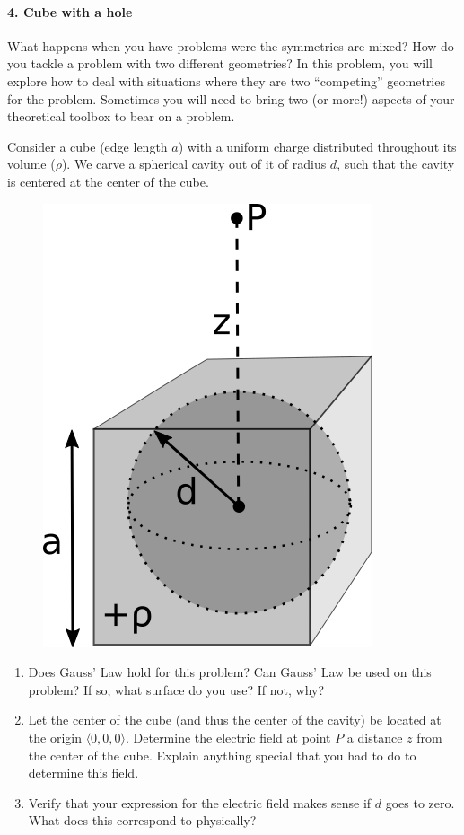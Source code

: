 \documentclass[11pt]{article}
\def\tightlist{}
\begin{document}
\paragraph{4. Cube with a hole}\label{cube-with-a-hole}

What happens when you have problems were the symmetries are mixed? How
do you tackle a problem with two different geometries? In this problem,
you will explore how to deal with situations where they are two
``competing'' geometries for the problem. Sometimes you will need to
bring two (or more!) aspects of your theoretical toolbox to bear on a
problem.

Consider a cube (edge length \(a\)) with a uniform charge distributed
throughout its volume (\(\rho\)). We carve a spherical cavity out of it
of radius \(d\), such that the cavity is centered at the center of the
cube.

\begin{figure}[htbp]
\centering
\includegraphics[width=0.4\linewidth]{./images/hw3/cube_w_hole.png}
\end{figure}

\begin{enumerate}
\def\labelenumi{\arabic{enumi}.}
\tightlist
\item
  Does Gauss' Law hold for this problem? Can Gauss' Law be used on this
  problem? If so, what surface do you use? If not, why?
\item
  Let the center of the cube (and thus the center of the cavity) be
  located at the origin \(\langle 0,0,0 \rangle\). Determine the
  electric field at point \(P\) a distance \(z\) from the center of the
  cube. Explain anything special that you had to do to determine this
  field.
\item
  Verify that your expression for the electric field makes sense if
  \(d\) goes to zero. What does this correspond to physically?
\end{enumerate}
\end{document}
